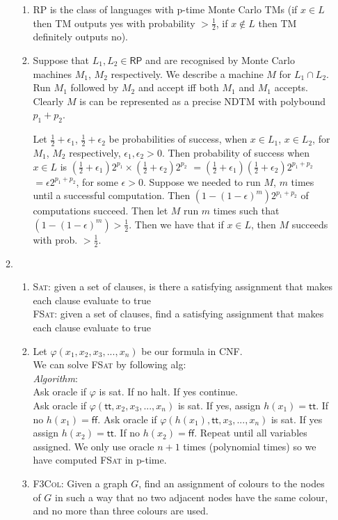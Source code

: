 \documentclass[a4paper, draft, 12pt]{article}
\begin{document}
\begin{enumerate}
\begin{enumerate}
  \begin{enumerate}
  \item %
  \textsf{RP} is the class of languages with p-time Monte Carlo TMs
  (if $x \in L$ then TM outputs yes with probability $> \frac{1}{2}$, 
  if $x \notin L$ then TM definitely outputs no).
  \item %
  Suppose that $L_1, L_2 \in \textsf{RP}$ and are recognised by Monte Carlo machines $M_1$, $M_2$ 
  respectively. We describe a machine $M$ for $L_1 \cap L_2$.  
  Run $M_1$ followed by $M_2$ and accept iff both $M_1$ and $M_1$ accepts.
  Clearly $M$ is can be represented as a precise NDTM with polybound $p_1 + p_2$.
  
  Let $\frac{1}{2} + \epsilon_1$, $\frac{1}{2} + \epsilon_2$ be probabilities 
  of success, when $x \in L_1$, $x \in L_2$, for $M_1$, $M_2$ respectively, $\epsilon_1, \epsilon_2 > 0$.
  Then probability of success when $x \in L$ is 
  $(\frac{1}{2} + \epsilon_1)2^{p_1} \times (\frac{1}{2} + \epsilon_2)2^{p_2}$
  $ = (\frac{1}{2} + \epsilon_1)(\frac{1}{2} + \epsilon_2)2^{p_1 + p_2}$ 
  $ = \epsilon 2^{p_1 + p_2}$, for some $\epsilon > 0$. 
  Suppose we needed to run $M$, $m$ times until a successful computation. Then
  $(1 - (1-\epsilon)^m) 2^{p_1 + p_2}$ of computations succeed. 
  Then let $M$ run $m$ times such that $(1 - (1-\epsilon)^m) > \frac{1}{2}$. 
  Then we have that if $x \in L$, then $M$ succeeds with prob. $> \frac{1}{2}$. 
  \end{enumerate}
\item %
  \begin{enumerate}
  \item %
  \textsc{Sat}: given a set of clauses, is there a satisfying assignment that 
  makes each clause evaluate to true\\
  \textsc{FSat}: given a set of clauses, find a satisfying assignment that 
  makes each clause evaluate to true
  \item %
  Let $\varphi(x_1,x_2,x_3,...,x_n)$ be our formula in CNF. \\
  We can solve \textsc{FSat} by following alg:\\
  \textit{Algorithm}:\\
  Ask oracle if $\varphi$ is sat. If no halt. If yes continue.\\
  Ask oracle if $\varphi(\textsf{tt},x_2,x_3,...,x_n)$ is sat.
  If yes, assign $h(x_1) = \textsf{tt}$. If no $h(x_1) = \textsf{ff}$.
  Ask oracle if $\varphi(h(x_1),\textsf{tt},x_3,...,x_n)$ is sat.
  If yes assign $h(x_2) = \textsf{tt}$. If no $h(x_2) = \textsf{ff}$.
  Repeat until all variables assigned.
  We only use oracle $n+1$ times (polynomial times) 
  so we have computed \textsc{FSat} in p-time.
  \item %
  \textsc{F3Col}: Given a graph $G$, find an assignment of colours to the nodes of $G$
  in such a way that no two adjacent nodes have the same colour, and no 
  more than three colours are used.


\end{enumerate}
\end{enumerate}
\end{enumerate}
\end{document}
